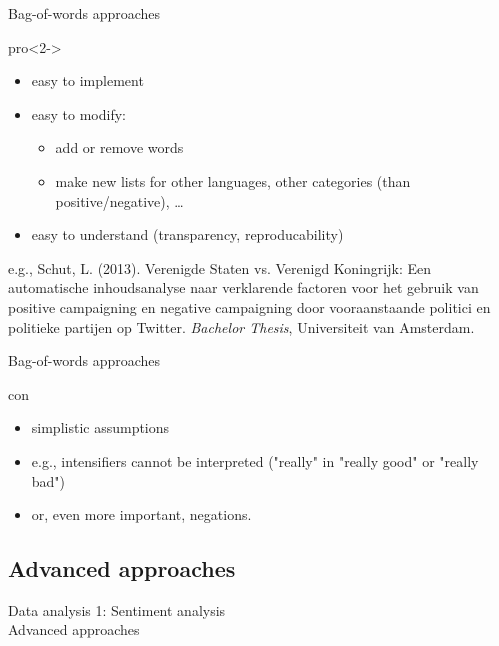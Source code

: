 \documentclass{beamer}
\begin{document}


\begin{frame}{Bag-of-words approaches}
\begin{block}{pro}<2->
\begin{itemize}
\item easy to implement
\item easy to modify:
\begin{itemize}
\item add or remove words
\item make new lists for other languages, other categories (than positive/negative), \dots
\end{itemize}
\item easy to understand (transparency, reproducability)
\end{itemize}
\end{block}
\par
\tiny{e.g., Schut, L. (2013). Verenigde Staten vs. Verenigd Koningrijk: Een automatische inhoudsanalyse naar verklarende factoren voor het gebruik van positive campaigning en negative campaigning door vooraanstaande politici en politieke partijen op Twitter. \emph{Bachelor Thesis}, Universiteit van Amsterdam.}\\
\end{frame}



\begin{frame}{Bag-of-words approaches}
\begin{block}{con}
\begin{itemize}
\item simplistic assumptions
\item e.g., intensifiers cannot be interpreted ("really" in "really good" or "really bad")
\item or, even more important, negations.
\end{itemize}
\end{block}
\end{frame}



\subsection{Advanced approaches}
\begin{frame}
Data analysis 1: Sentiment analysis\\
Advanced approaches
\end{frame}
\end{document}
